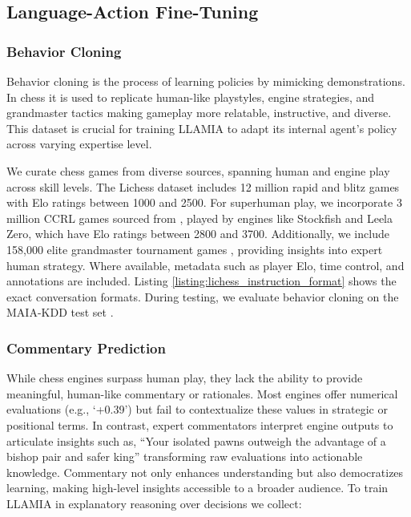 \subsection{Language-Action Fine-Tuning}
\label{subsec:language_action }
\subsubsection{Behavior Cloning}
Behavior cloning is the process of learning policies by mimicking demonstrations. In chess it is used to replicate human-like playstyles, engine strategies, and grandmaster tactics making gameplay more relatable, instructive, and diverse. This dataset is crucial for training LLAMIA to adapt its internal agent’s policy across varying expertise level.

We curate chess games from diverse sources, spanning human and engine play across skill levels. The Lichess dataset includes 12 million rapid and blitz games with Elo ratings between 1000 and 2500. For superhuman play, we incorporate 3 million CCRL games sourced from \cite{feng2024chessgpt},  played by engines like Stockfish and Leela Zero, which have Elo ratings between 2800 and 3700. Additionally, we include 158,000 elite grandmaster tournament games \cite{gmchessgames2022}, providing insights into expert human strategy. Where available, metadata such as player Elo, time control, and annotations are included. Listing \ref{listing:lichess_instruction_format} shows the exact conversation formats. 
During testing, we evaluate behavior cloning on the MAIA-KDD test set \cite{mcilroy2020aligning}.

\subsubsection{Commentary Prediction}
\label{sec:commentary}
While chess engines surpass human play, they lack the ability to provide meaningful, human-like commentary or rationales. Most engines offer numerical evaluations (e.g., `+0.39') but fail to contextualize these values in strategic or positional terms. In contrast, expert commentators interpret engine outputs to articulate insights such as, ``Your isolated pawns outweigh the advantage of a bishop pair and safer king'' transforming raw evaluations into actionable knowledge. Commentary not only enhances understanding but also democratizes learning, making high-level insights accessible to a broader audience. To train LLAMIA in explanatory reasoning over decisions we collect:


